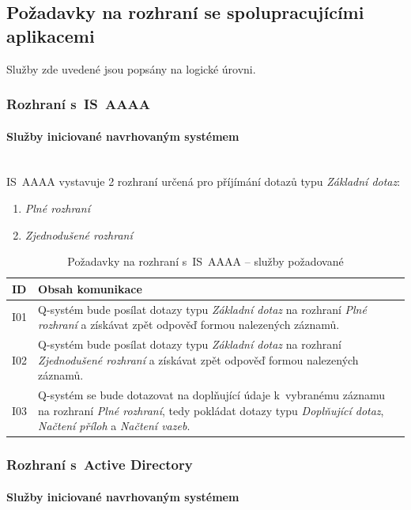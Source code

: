 \documentclass[thesis=M,czech]{FITthesis}[2019/12/23]
\newcommand{\lbparagraph}[1]{\paragraph{#1}\mbox{}\\} %
\begin{document}
\subsection{Požadavky na rozhraní se spolupracujícími aplikacemi}
Služby zde uvedené jsou popsány na logické úrovni. 

\subsubsection{Rozhraní s~IS~AAAA}
\lbparagraph{Služby iniciované navrhovaným systémem}
IS~AAAA vystavuje 2 rozhraní určená pro příjímání dotazů typu \textit{Základní dotaz}:
\begin{enumerate}
	\item \textit{Plné rozhraní}
	\item \textit{Zjednodušené rozhraní}
\end{enumerate}

\begin{table}[H]
	\centering
	\begin{tabular}{|p{}|p{}|}
		\hline
  		{\textbf{ID}} & {\textbf{Obsah komunikace}} \\
  		\hline \hline
  		I01 & Q-systém bude posílat dotazy typu \textit{Základní dotaz} na rozhraní \textit{Plné rozhraní} a získávat zpět odpověď formou nalezených záznamů. \\ \hline
		I02 & Q-systém bude posílat dotazy typu \textit{Základní dotaz} na rozhraní \textit{Zjednodušené rozhraní} a získávat zpět odpověď formou nalezených záznamů. \\ \hline
		I03 & Q-systém se bude dotazovat na doplňující údaje k~vybranému záznamu na rozhraní \textit{Plné rozhraní}, tedy pokládat dotazy typu \textit{Doplňující dotaz}, \textit{Načtení příloh} a \textit{Načtení vazeb}. \\ \hline
	\end{tabular}
 	\caption{Požadavky na rozhraní s~IS~AAAA – služby požadované}
 	\label{tab:Požadavky na rozhraní s~IS~AAAA – služby požadované}
\end{table}

\subsubsection{Rozhraní s~Active Directory}
\lbparagraph{Služby iniciované navrhovaným systémem}
\end{document}

